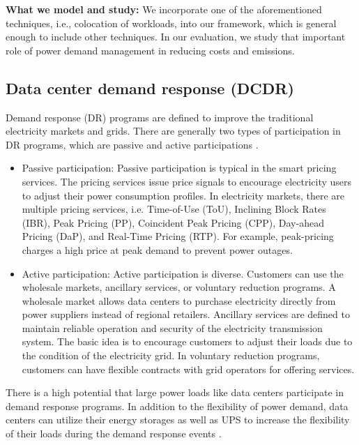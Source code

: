 \textbf{What we model and study:} We incorporate one of the aforementioned techniques, i.e., colocation of workloads, into our framework, which is general enough to include other techniques. In our evaluation, we study that important role of power demand management in reducing costs and emissions.

\subsection{Data center demand response (DCDR)}

Demand response (DR) programs are defined to improve the traditional electricity markets and grids. There are generally two types of participation in DR programs, which are passive and active participations \cite{wierman2014opportunities}. 
\hidevspace{\vspace{-0.15cm}}
\begin{itemize}
	\item Passive participation: Passive participation is typical in the smart pricing services. The pricing services issue price signals to encourage electricity users to adjust their power consumption profiles. In electricity markets, there are multiple pricing services, i.e. Time-of-Use (ToU), Inclining Block Rates (IBR), Peak Pricing (PP), Coincident Peak Pricing (CPP), Day-ahead Pricing (DaP), and Real-Time Pricing (RTP). For example, peak-pricing charges a high price at peak demand to prevent power outages.	
	
	\hidevspace{\vspace{-0.15cm}}
	
	\item Active participation: Active participation is diverse. Customers can use the wholesale markets, ancillary services, or voluntary reduction programs. A wholesale market allows data centers to purchase electricity directly from power suppliers instead of regional retailers. Ancillary services are defined to maintain reliable operation and security of the electricity transmission system. The basic idea is to encourage customers to adjust their loads due to the condition of the electricity grid. In voluntary reduction programs, customers can have flexible contracts with grid operators for offering services.
	
	\hidevspace{\vspace{-0.15cm}}
\end{itemize}

There is a high potential that large power loads like data centers participate in demand response programs. In addition to the flexibility of power demand, data centers can utilize their energy storages as well as UPS to increase the flexibility of their loads during the demand response events \cite{liu2014pricing,wierman2014opportunities}.

